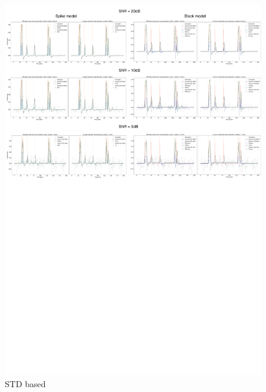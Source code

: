 \begin{figure}[t!]
    \begin{center}
        \includegraphics[width=\textwidth]{figures/std_based.pdf}
    \end{center}
    \caption{STD based}
\label{fig:std}
\end{figure}

